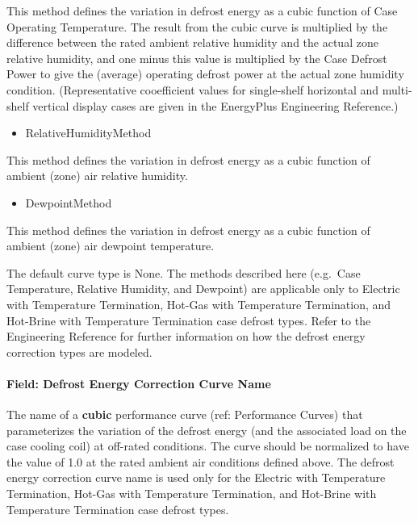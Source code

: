 This method defines the variation in defrost energy as a cubic function of Case Operating Temperature. The result from the cubic curve is multiplied by the difference between the rated ambient relative humidity and the actual zone relative humidity, and one minus this value is multiplied by the Case Defrost Power to give the (average) operating defrost power at the actual zone humidity condition. (Representative cooefficient values for single-shelf horizontal and multi-shelf vertical display cases are given in the EnergyPlus Engineering Reference.)

\begin{itemize}
\tightlist
\item
  RelativeHumidityMethod
\end{itemize}

This method defines the variation in defrost energy as a cubic function of ambient (zone) air relative humidity.

\begin{itemize}
\tightlist
\item
  DewpointMethod
\end{itemize}

This method defines the variation in defrost energy as a cubic function of ambient (zone) air dewpoint temperature.

The default curve type is None. The methods described here (e.g.~Case Temperature, Relative Humidity, and Dewpoint) are applicable only to Electric with Temperature Termination, Hot-Gas with Temperature Termination, and Hot-Brine with Temperature Termination case defrost types. Refer to the Engineering Reference for further information on how the defrost energy correction types are modeled.

\paragraph{Field: Defrost Energy Correction Curve Name}\label{field-defrost-energy-correction-curve-name}

The name of a \textbf{cubic} performance curve (ref: Performance Curves) that parameterizes the variation of the defrost energy (and the associated load on the case cooling coil) at off-rated conditions. The curve should be normalized to have the value of 1.0 at the rated ambient air conditions defined above. The defrost energy correction curve name is used only for the Electric with Temperature Termination, Hot-Gas with Temperature Termination, and Hot-Brine with Temperature Termination case defrost types.

